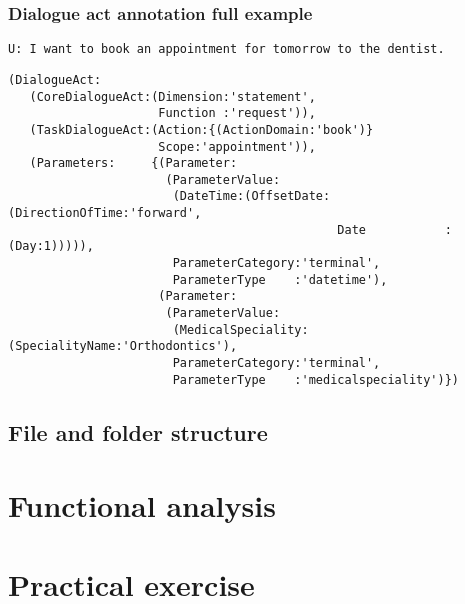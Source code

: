 \documentclass[11pt]{beamer}
\begin{document}
\begin{frame}[fragile]
\frametitle{Dialogue act annotation full example}
{\color{teal} 
	\texttt{U: I want to book an appointment for tomorrow to the dentist.}\\
}
\pause
\vspace{15pt}
\tiny
\begin{lstlisting}[language=lekta]
(DialogueAct:
   (CoreDialogueAct:(Dimension:'statement',
                     Function :'request')),
   (TaskDialogueAct:(Action:{(ActionDomain:'book')}
                     Scope:'appointment')),
   (Parameters:     {(Parameter:
                      (ParameterValue:
                       (DateTime:(OffsetDate:(DirectionOfTime:'forward',
                                              Date           :(Day:1))))),
                       ParameterCategory:'terminal',
                       ParameterType    :'datetime'),
                     (Parameter:
                      (ParameterValue:
                       (MedicalSpeciality:(SpecialityName:'Orthodontics'),
                       ParameterCategory:'terminal',
                       ParameterType    :'medicalspeciality')})
\end{lstlisting}
\end{frame}
				
\subsection{File and folder structure}

\begin{frame}
\end{frame}

\section{Functional analysis}

\begin{frame}
\end{frame}

\section{Practical exercise}

\begin{frame}
\end{frame}
\end{document}
